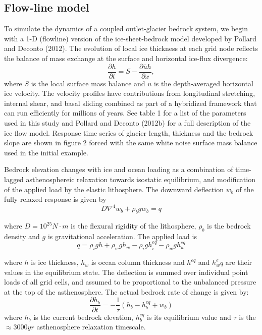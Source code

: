 \documentclass[tc, manuscript]{copernicus}
\begin{document}
\subsection{Flow-line model}
To simulate the dynamics of a coupled outlet-glacier bedrock system, we begin with a 1-D (flowline) version of the ice-sheet-bedrock model developed by Pollard and Deconto (2012). The evolution of local ice thickness at each grid node reflects the balance of mass exchange at the surface and horizontal ice-flux divergence: 
\begin{equation}
\frac{\partial h}{\partial t} = S - \frac{\partial \bar{u}h}{\partial x},
\end{equation}
where $S$ is the local surface mass balance and $\bar{u}$ is the depth-averaged horizontal ice velocity. The velocity profiles have contributions from longitudinal stretching, internal shear, and basal sliding combined as part of a hybridized framework that can run efficiently for millions of years.
See table 1 for a list of the parameters used in this study and Pollard and Deconto (2012b) for a full description of the ice flow model. 
Response time series of glacier length, thickness and the bedrock slope are shown in figure 2 forced with the same white noise surface mass balance used in the initial example.

Bedrock elevation changes with ice and ocean loading as a combination of time-lagged asthenosphereic relaxation towards isostatic equilibrium, and modification of the applied load by the elastic lithosphere. The downward deflection $w_b$ of the fully relaxed response is given by 
\begin{equation}
D\nabla^4 w_b + \rho_b g w_b = q
\end{equation}

where $D = 10^{25} N\cdot m$ is the flexural rigidity of the lithosphere, $\rho_b$ is the bedrock density and $g$ is gravitational acceleration. The applied load is 
\begin{equation}
q = \rho_i g h + \rho_w g h_w - \rho_i g h_i^{eq} - \rho_w g h_w^{eq} 
\end{equation}

where $h$ is ice thickness, $h_w$ is ocean column thickness and $h^{eq}$ and $h_w^eq$ are their values in the equilibrium state. The deflection is summed over individual point loads of all grid cells, and assumed to be proportional to the unbalanced pressure at the top of the asthenosphere. The actual bedrock rate of change is given by:
\begin{equation}
\frac{\partial h_b}{\partial t} = -\frac{1}{\tau} \left(h_b - h_b^{eq} + w_b \right)
\end{equation}
where $h_b$ is the current bedrock elevation, $h_b^{eq}$ is its equilibrium value and $\tau$ is the $\approx 3000yr$ asthenosphere relaxation timescale.
\end{document}
